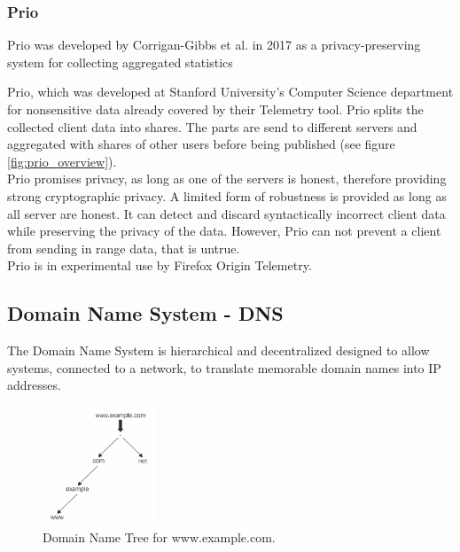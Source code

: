     \subsubsection{Prio}

        Prio was developed by Corrigan-Gibbs et al.\cite{corrigan-gibbs_prio_2017} in 2017 as a privacy-preserving
        system for collecting aggregated statistics
        
        Prio\cite{corrigan-gibbs_prio_2017}, which was developed at Stanford University's Computer Science department for nonsensitive data already covered by their Telemetry tool. 
        Prio splits the collected client data into shares. 
        The parts are send to different servers and aggregated with shares of other users before being published (see figure \ref{fig:prio_overview})\cite{corrigan-gibbs_prio_2017}.\\
        Prio promises privacy, as long as one of the servers is honest, therefore providing strong cryptographic privacy. A limited form of robustness is provided as long as all server are honest. It can detect and discard syntactically incorrect client data while preserving the privacy of the data. However, Prio can not prevent a client from sending in range data, that is untrue\cite{corrigan-gibbs_prio_2017}.\\
        Prio is in experimental use by Firefox Origin Telemetry\cite{englehardt_next_2019}.
        
        
    \subsection{Domain Name System - DNS}
        \label{subsec:related:dns}
        The Domain Name System is hierarchical and decentralized designed to allow systems, connected to a network, to translate memorable domain names into IP addresses\cite{stevens_tcpip_1993}.\\
        \begin{figure}
            \includegraphics[width=0.3\textwidth]{latex/figures/domain_name_tree.jpg}
            \caption[Domain Name Tree for www.example.com.]{Domain Name Tree for www.example.com. \cite{jeftovic_managing_2018}}
            \label{fig:dns_tree}
        \end{figure}
        
